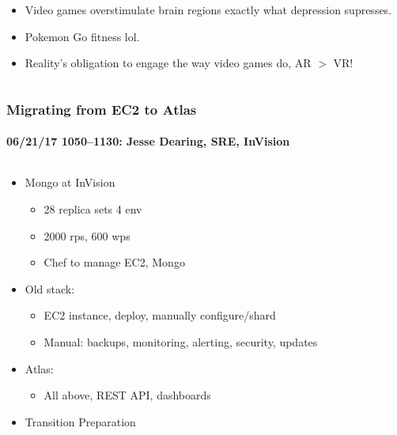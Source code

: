 \documentclass[xcolor=dvipsnames, 9pt]{beamer}
\begin{document}
\begin{frame}
\begin{columns}
\begin{column}{0.5\textwidth}
\begin{itemize}
\begin{itemize}
{                            depression.''}
                        \item Video games overstimulate brain regions exactly
                            what depression supresses.
                        \item Pokemon Go fitness lol.
                        \item Reality's obligation to engage the way video games
                            do, AR $>$ VR!%
                    \end{itemize}
            \end{itemize}
        \end{column}
    \end{columns}
\end{frame}

\begin{frame}
    \frametitle{Migrating from EC2 to Atlas}
    \framesubtitle{%
        06/21/17 1050--1130:
        Jesse Dearing, SRE, InVision
    }
    \begin{columns}
        \begin{column}{0.5\textwidth}
            \begin{itemize}
                \item Mongo at InVision
                    \begin{itemize}
                        \item 28 replica sets 4 env
                        \item 2000 rps, 600 wps
                        \item Chef to manage EC2, Mongo
                    \end{itemize}
                \item Old stack:
                    \begin{itemize}
                        \item EC2 instance, deploy, manually configure/shard
                        \item Manual: backups, monitoring, alerting, security, updates
                    \end{itemize}
                \item Atlas:
                    \begin{itemize}
                        \item All above, REST API, dashboards
                    \end{itemize}
                \item Transition Preparation

\end{itemize}
\end{column}
\end{columns}
\end{frame}
\end{document}
